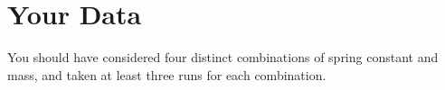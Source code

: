 \section{Your Data}
%
You should have considered four distinct combinations of spring constant and mass, and taken at least three runs for each combination.
%
